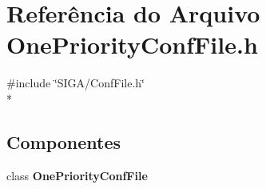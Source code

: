 \section{Referência do Arquivo One\+Priority\+Conf\+File.\+h}
\label{_one_priority_conf_file_8h}
{\ttfamily \#include \char`\"{}S\+I\+G\+A/\+Conf\+File.\+h\char`\"{}}\\*
\subsection*{Componentes}
\begin{DoxyCompactItemize}
\item 
class {\bf One\+Priority\+Conf\+File}
\end{DoxyCompactItemize}
